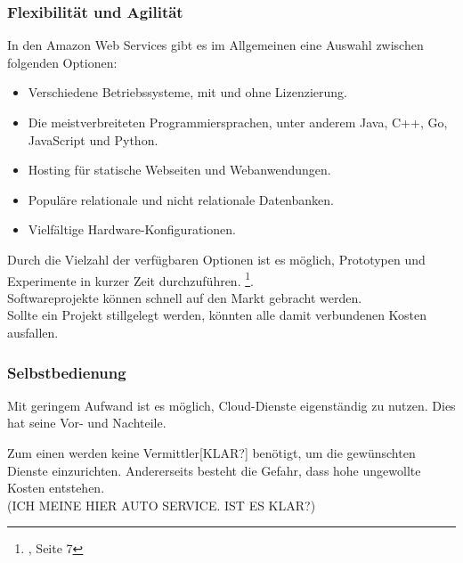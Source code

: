 \subsubsection{Flexibilität und Agilität}
In den Amazon Web Services gibt es im Allgemeinen eine Auswahl zwischen folgenden Optionen:
\begin{itemize}
      \item
            Verschiedene Betriebssysteme, mit und ohne Lizenzierung.
      \item
            Die meistverbreiteten Programmiersprachen, unter anderem Java, C++, Go, JavaScript und Python.{\cite{AMZ03}}

      \item
            Hosting für statische Webseiten und Webanwendungen.
            {\cite{AMZ04}}

      \item
            Populäre relationale und nicht relationale Datenbanken.
            {\cite{AMZ10}}
      \item
            Vielfältige Hardware-Konfigurationen.

\end{itemize}
\begin{flushleft}
      Durch die Vielzahl der verfügbaren Optionen ist es möglich, Prototypen und Experimente in kurzer Zeit durchzuführen.
      \footnote{{\cite{IDC01}}, Seite 7}.
      \\
      Softwareprojekte können schnell auf den Markt gebracht werden. 
      \\
      Sollte ein Projekt stillgelegt werden, könnten alle damit verbundenen Kosten ausfallen.
\end{flushleft}

\subsubsection{Selbstbedienung}
Mit geringem Aufwand ist es möglich, Cloud-Dienste eigenständig zu nutzen. 
Dies hat seine Vor- und Nachteile. 

Zum einen werden keine Vermittler[KLAR?] benötigt, um die gewünschten Dienste einzurichten. Andererseits besteht die Gefahr, dass hohe ungewollte Kosten entstehen.
\\ (ICH MEINE HIER AUTO SERVICE. IST ES KLAR?)

